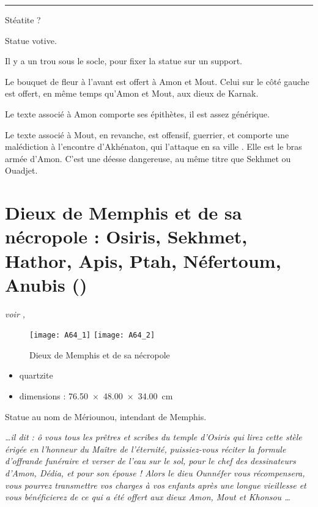 \documentclass[dvipsnames,a4paper,twoside,10pt,openany,article]{memoir}
\newcommand{\separation}{%
  {\noi\hspace*{\fill}\rule{.33\textwidth}{1pt}\hspace*{\fill}}%
}
\begin{document}
\separation

Stéatite ?

Statue votive.

Il y a un trou sous le socle, pour fixer la statue sur un support.

Le bouquet de fleur à l'avant est offert à Amon et Mout. Celui sur 
le côté gauche est offert, en même temps qu'Amon et Mout, aux dieux 
de Karnak.

Le texte associé à Amon comporte ses épithètes, il est assez générique.

Le texte associé à Mout, en revanche, est offensif, guerrier, et 
comporte une malédiction à l'encontre d'Akhénaton, \og qui l'attaque 
en sa ville \fg. Elle est le bras armée d'Amon. C'est une déesse 
dangereuse, au même titre que Sekhmet ou Ouadjet.


\chapter{Dieux de Memphis et de sa nécropole : Osiris, Sekhmet, 
         Hathor, Apis, Ptah, Néfertoum, Anubis ()}
\label{sec:A64}

\puceb{} \emph{voir , }
\bigskip

\begin{figure}[!h]
  \texttt{[image: A64\_1]}%
  \quad%
  \texttt{[image: A64\_2]}%
  \caption{Dieux de Memphis et de sa nécropole }
  \label{fig:A64}
\end{figure}

\begin{itemize}
  \item quartzite
  \item dimensions : \SI{76.50x48.00x34.00}{\cm}
\end{itemize}

\og Statue \fg au nom de Mériounou, intendant de Memphis.

\emph{\dots il dit : \og ô vous tous les prêtres et scribes du 
temple d'Osiris qui lirez cette stèle érigée en l'honneur du Maître 
de l'éternité, puissiez-vous réciter la formule d'offrande funéraire 
et verser de l'eau sur le sol, pour le chef des dessinateurs d'Amon, 
Dédia, et pour son épouse ! Alors le dieu Ounnéfer vous récompensera, 
vous pourrez transmettre vos charges à vos enfants après une longue 
vieillesse et vous bénéficierez de ce qui a été offert aux dieux Amon, 
Mout et Khonsou \dots \fg}
\end{document}
